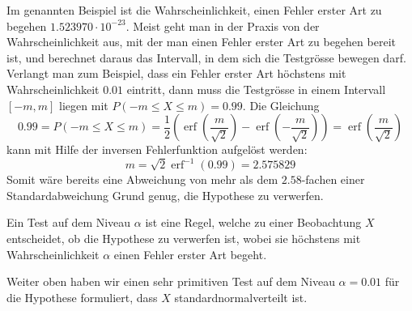 Im genannten Beispiel ist die Wahrscheinlichkeit, einen Fehler erster
Art zu begehen $1.523970\cdot 10^{-23}$.
Meist geht man in der Praxis von der
Wahrscheinlichkeit aus, mit der man einen Fehler erster Art zu begehen
bereit ist, und berechnet daraus das Intervall, in dem sich die
Testgrösse bewegen darf.
Verlangt man zum Beispiel, dass ein Fehler erster
Art höchstens mit Wahrscheinlichkeit $0.01$ eintritt, dann muss die 
Testgrösse in einem Intervall $[-m,m]$ liegen mit $P(-m\le X\le m)=0.99$.
Die Gleichung
\[
0.99 = P(-m\le X\le m)
=\frac12\left(\operatorname{erf}(\frac{m}{\sqrt{2}})-\operatorname{erf}(-\frac{m}{\sqrt{2}})\right)
=\operatorname{erf}(\frac{m}{\sqrt{2}})
\]
kann mit Hilfe der inversen Fehlerfunktion aufgelöst werden:
\[
m=\sqrt{2}\operatorname{erf}^{-1}(0.99)=2.575829
\]
Somit wäre bereits eine Abweichung von mehr als dem $2.58$-fachen einer
Standardabweichung Grund genug, die Hypothese zu verwerfen.

\begin{definition}
Ein Test auf dem Niveau $\alpha$ ist eine Regel, welche zu einer
Beobachtung $X$ entscheidet, ob die Hypothese zu verwerfen ist, wobei
sie höchstens mit Wahrscheinlichkeit $\alpha$ einen Fehler erster
Art begeht.
\end{definition}

Weiter oben haben wir einen sehr primitiven Test auf dem Niveau
$\alpha=0.01$ für die
Hypothese formuliert, dass $X$ standardnormalverteilt ist.

